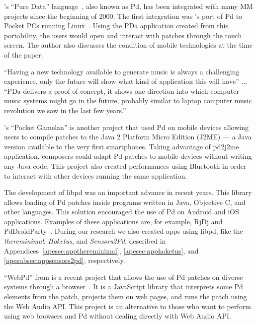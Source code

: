 's ``Pure Data'' language~\citep{Puckette1997puredata}, also known as Pd, has been integrated with many MM projects since the beginning of 2000.
The first integration was 's port of Pd to Pocket PCs running Linux~\citep{Geiger2003pda}.
Using the PDa application created from this portability, the users would open and interact with patches through the touch screen.
The author also discusses the condition of mobile technologies at the time of the paper:

\begin{adjustwidth}{6 em}{0pt}
	``Having a new technology available to generate music is always a challenging experience, only the future will show what kind of application this will have'' ... ``PDa delivers a proof of concept, it shows one direction into which computer music systems might go in the future, probably similar to laptop computer music revolution we saw in the last few years.'' \cite[p.~4]{Geiger2003pda} 
\end{adjustwidth}

\citeauthor{Schiemer2005pocketgamelan}'s ``Pocket Gamelan'' is another project that used Pd on mobile devices allowing users to compile patches to the Java 2 Platform Micro Edition (J2ME) --- a Java version available to the very first smartphones.
Taking advantage of pd2j2me application, composers could adapt Pd patches to mobile devices without writing any Java code.
This project also created performances using Bluetooth in order to interact with other devices running the same application.

The development of libpd was an important advance in recent years.
This library allows loading of Pd patches inside programs written in Java, Objective C, and other languages.
This solution encouraged the use of Pd on Android and iOS applications.
Examples of these applications are, for example, RjDj and PdDroidParty~\citep{Brinkmann2011embeddingpd,Brinkmann2012makingmusicalapps}.
During our research we also created apps using libpd, like the \textit{thereminimal}, \textit{Hoketus}, and \textit{Sensors2Pd}, described in Appendices~\ref{apesec:appthereminimal}, \ref{apesec:apphoketus}, and \ref{apesubsec:appsensors2pd}, respectively.

``WebPd'' from \citeauthor{Piquemal2017webpd} is a recent project that allows the use of Pd patches on diverse systems through a browser~\citep{Piquemal2017webpd}.
It is a JavaScript library that interprets some Pd elements from the patch, projects them on web pages, and runs the patch using the Web Audio API.
This project is an alternative to those who want to perform using web browsers and Pd without dealing directly with Web Audio API.

